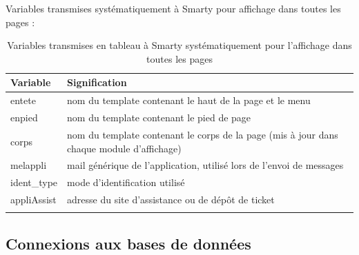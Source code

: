 Variables transmises systématiquement à Smarty pour affichage dans toutes les pages :

\begin{longtable}{|p{5cm}|p{8cm}|}
\hline
\textbf{Variable} & \textbf{Signification} \\
\hline
\endhead
entete & nom du template contenant le haut de la page et le menu \\

enpied & nom du template contenant le pied de page \\

corps & nom du template contenant le corps de la page (mis à jour dans chaque module d'affichage)\\

melappli & mail générique de l'application, utilisé lors de l'envoi de messages \\

ident\_type & mode d'identification utilisé \\

appliAssist & adresse du site d'assistance ou de dépôt de ticket \\
\hline
\caption{Variables transmises en tableau à Smarty systématiquement pour l'affichage dans toutes les pages}
\end{longtable}


\subsection{Connexions aux bases de données}

